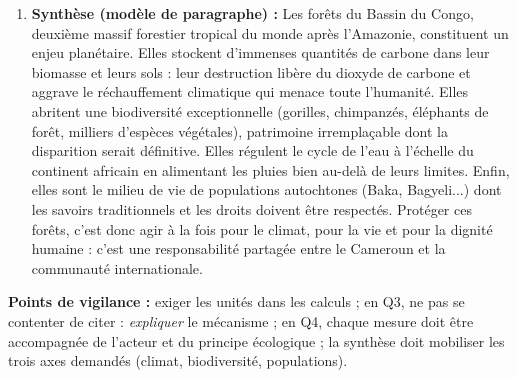 \documentclass[11pt]{article}
\begin{document}
\begin{corrige}
\begin{enumerate}
\begin{itemize}
        \item \textbf{Création et gestion d'aires protégées} (parcs nationaux, réserves) — acteur : \textbf{État} (MINFOF) ; principe : sanctuarisation des habitats.
        \item \textbf{Agroforesterie cacaoyère} (cacao sous couvert forestier) — acteurs : \textbf{populations locales et ONG} ; principe : concilier production agricole et maintien du couvert arboré.
        \item \textbf{Reboisement des zones dégradées et promotion des foyers améliorés / gaz domestique} — acteurs : \textbf{État, secteur privé, populations} ; principe : restaurer les sols et réduire la pression sur le bois de feu.
    \end{itemize}
    \item \textbf{Synthèse (modèle de paragraphe) :} Les forêts du Bassin du Congo, deuxième massif forestier tropical du monde après l'Amazonie, constituent un enjeu planétaire. Elles stockent d'immenses quantités de carbone dans leur biomasse et leurs sols : leur destruction libère du dioxyde de carbone et aggrave le réchauffement climatique qui menace toute l'humanité. Elles abritent une biodiversité exceptionnelle (gorilles, chimpanzés, éléphants de forêt, milliers d'espèces végétales), patrimoine irremplaçable dont la disparition serait définitive. Elles régulent le cycle de l'eau à l'échelle du continent africain en alimentant les pluies bien au-delà de leurs limites. Enfin, elles sont le milieu de vie de populations autochtones (Baka, Bagyeli...) dont les savoirs traditionnels et les droits doivent être respectés. Protéger ces forêts, c'est donc agir à la fois pour le climat, pour la vie et pour la dignité humaine : c'est une responsabilité partagée entre le Cameroun et la communauté internationale.
\end{enumerate}

\textbf{Points de vigilance :} exiger les unités dans les calculs ; en Q3, ne pas se contenter de citer : \emph{expliquer} le mécanisme ; en Q4, chaque mesure doit être accompagnée de l'acteur et du principe écologique ; la synthèse doit mobiliser les trois axes demandés (climat, biodiversité, populations).
\end{corrige}
\end{document}
